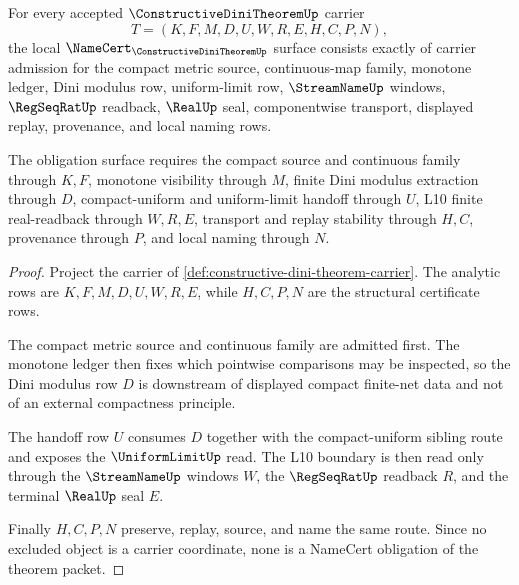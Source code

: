 \begin{theorem}
\label{thm:constructive-dini-theorem-namecert-obligations}
For every accepted $\ConstructiveDiniTheoremUp$ carrier
$$
T=(K,F,M,D,U,W,R,E,H,C,P,N),
$$
the local $\NameCert_{\ConstructiveDiniTheoremUp}$ surface consists exactly of carrier admission for the compact metric source, continuous-map family, monotone ledger, Dini modulus row, uniform-limit row, $\StreamNameUp$ windows, $\RegSeqRatUp$ readback, $\RealUp$ seal, componentwise transport, displayed replay, provenance, and local naming rows.

The obligation surface requires the compact source and continuous family through $K,F$, monotone visibility through $M$, finite Dini modulus extraction through $D$, compact-uniform and uniform-limit handoff through $U$, L10 finite real-readback through $W,R,E$, transport and replay stability through $H,C$, provenance through $P$, and local naming through $N$.
\end{theorem}
\begin{proof}
Project the carrier of \autoref{def:constructive-dini-theorem-carrier}. The analytic rows are $K,F,M,D,U,W,R,E$, while $H,C,P,N$ are the structural certificate rows.

The compact metric source and continuous family are admitted first. The monotone ledger then fixes which pointwise comparisons may be inspected, so the Dini modulus row $D$ is downstream of displayed compact finite-net data and not of an external compactness principle.

The handoff row $U$ consumes $D$ together with the compact-uniform sibling route and exposes the $\UniformLimitUp$ read. The L10 boundary is then read only through the $\StreamNameUp$ windows $W$, the $\RegSeqRatUp$ readback $R$, and the terminal $\RealUp$ seal $E$.

Finally $H,C,P,N$ preserve, replay, source, and name the same route. Since no excluded object is a carrier coordinate, none is a NameCert obligation of the theorem packet.
\end{proof}


